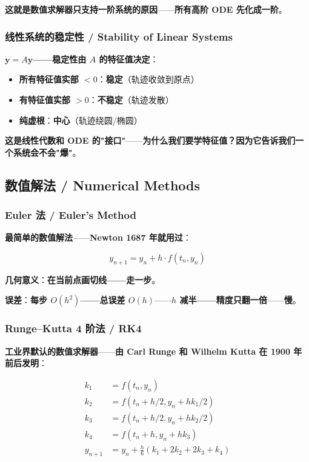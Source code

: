 \textbf{这就是数值求解器只支持一阶系统的原因}——\textbf{所有高阶 ODE 先化成一阶}。

\subsubsection{线性系统的稳定性 / Stability of Linear Systems}

\textbf{$\dot{\bm{y}} = A \bm{y}$——稳定性由 $A$ 的特征值决定}：

\begin{itemize}
\item \textbf{所有特征值实部 $< 0$}：\textbf{稳定}（轨迹收敛到原点）
\item \textbf{有特征值实部 $> 0$}：\textbf{不稳定}（轨迹发散）
\item \textbf{纯虚根}：\textbf{中心}（轨迹绕圆/椭圆）
\end{itemize}

\textbf{这是\textbf{线性代数和 ODE 的"接口"}}——\textbf{为什么我们要学特征值？因为它告诉我们一个系统会不会"爆"}。

\subsection{数值解法 / Numerical Methods}

\subsubsection{Euler 法 / Euler's Method}

\textbf{最简单的数值解法}——\textbf{Newton 1687 年就用过}：

\[
y_{n+1} = y_n + h \cdot f(t_n, y_n)
\]

\textbf{几何意义}：\textbf{在当前点画切线——走一步}。

\textbf{误差}：\textbf{每步 $O(h^2)$——总误差 $O(h)$}——\textbf{$h$ 减半——精度只翻一倍}——\textbf{慢}。

\subsubsection{Runge--Kutta 4 阶法 / RK4}

\textbf{工业界默认的数值求解器}——\textbf{由 Carl Runge 和 Wilhelm Kutta 在 1900 年前后发明}：

\begin{align}
k_1 &= f(t_n, y_n) \\
k_2 &= f(t_n + h/2, y_n + h k_1 / 2) \\
k_3 &= f(t_n + h/2, y_n + h k_2 / 2) \\
k_4 &= f(t_n + h, y_n + h k_3) \\
y_{n+1} &= y_n + \frac{h}{6}(k_1 + 2k_2 + 2k_3 + k_4)
\end{align}

